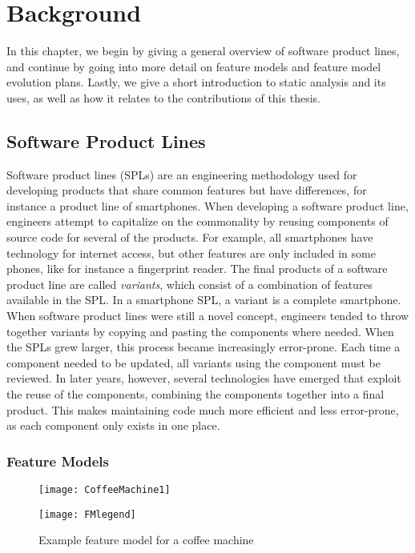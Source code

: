 \chapter{Background} 
\label{cha:background}

In this chapter, we begin by giving a general overview of software product lines, and continue by going into more detail on feature models and feature model evolution plans. Lastly, we give a short introduction to static analysis and its uses, as well as how it relates to the contributions of this thesis.

\section{Software Product Lines}
\label{sec:software-product-lines}

Software product lines (SPLs) are an engineering methodology used for developing products that share common features but have differences, for instance a product line of smartphones. When developing a software product line, engineers attempt to capitalize on the commonality by reusing components of source code for several of the products. For example, all smartphones have technology for internet access, but other features are only included in some phones, like for instance a fingerprint reader. The final products of a software product line are called \emph{variants}, which consist of a combination of features available in the SPL. In a smartphone SPL, a variant is a complete smartphone. When software product lines were still a novel concept, engineers tended to throw together variants by copying and pasting the components where needed. When the SPLs grew larger, this process became increasingly error-prone. Each time a component needed to be updated, all variants using the component must be reviewed. In later years, however, several technologies have emerged that exploit the reuse of the components, combining the components together into a final product. This makes maintaining code  much more efficient and less error-prone, as each component only exists in one place.~\cite{book:introduction-to-spl}


\subsection{Feature Models}
\label{sub:feature-models}

\begin{figure}
   \begin{center}
      \texttt{[image: CoffeeMachine1]}
   \end{center}
   \hspace{25mm} \texttt{[image: FMlegend]}
   \caption[Example feature model for a coffee machine]{Example feature model for a coffee machine \protect\footnotemark}
   \label{ex:fm-coffee1}
\end{figure}

